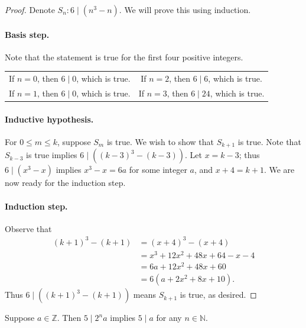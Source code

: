 \documentclass{exam}
\begin{document}
\begin{proof}
    Denote $S_n: 6\mid(n^3-n)$. We will prove this using induction.
    \paragraph{Basis step.} Note that the statement is true for the first four positive integers.
    
    \begin{tabular}{cc}
        If $n=0$, then $6\mid0$, which is true.&If $n=2$, then $6\mid6$, which is true.\\
        If $n=1$, then $6\mid0$, which is true.&If $n=3$, then $6\mid24$, which is true.
    \end{tabular}
    \paragraph{Inductive hypothesis.} For $0\le m\le k$, suppose $S_m$ is true. We wish to show that $S_{k+1}$ is true. Note that $S_{k-3}$ is true implies $6\mid((k-3)^3-(k-3))$. Let $x = k-3$; thus $6\mid(x^3-x)$ implies $x^3-x=6a$ for some integer $a$, and $x + 4 = k + 1$. We are now ready for the induction step.
    \paragraph{Induction step.} Observe that
    \begin{align*}
        (k+1)^3-(k+1)&=(x+4)^3-(x+4)\\
        &=x^3+12x^2+48x+64-x-4\\
        &=6a+12x^2+48x+60\\
        &=6(a+2x^2+8x+10).
    \end{align*}
    Thus $6\mid((k+1)^3-(k+1))$ means $S_{k+1}$ is true, as desired.
\end{proof}

\begin{proposition}{10.14}
    Suppose $a\in\mathbb Z$. Then $5\mid2^na$ implies $5\mid a$ for any $n\in\mathbb N$.
\end{proposition}
\end{document}
